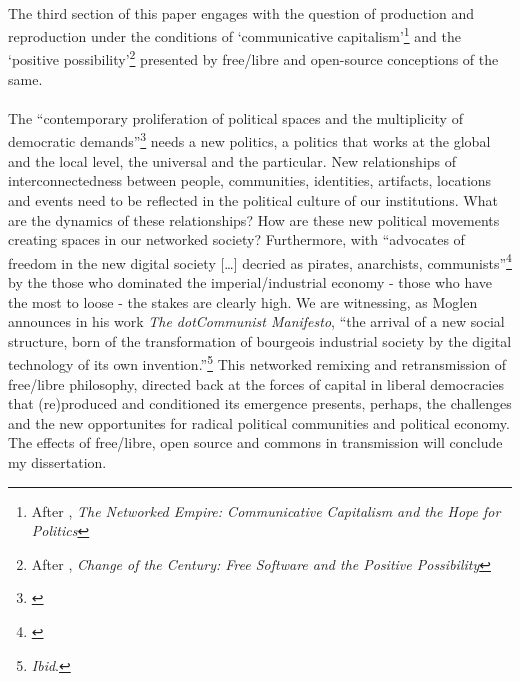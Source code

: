 \paragraph{}The third section of this paper engages with the question of production and reproduction under the conditions of `communicative capitalism'\footnote{After \cite{dean:2005cc}, \textit{The Networked Empire: Communicative Capitalism and the Hope for Politics}} and the `positive possibility'\footnote{After \cite{Hardie:2005px}, \textit{Change of the Century: Free Software and the Positive Possibility}} presented by free/libre and open-source conceptions of the same. 

\paragraph{}The ``contemporary proliferation of political spaces and the multiplicity of democratic demands''\footnote{\cite[p.17]{Mouffe:2000fk}} needs a new politics, a politics that works at the global and the local level, the universal and the particular. New relationships of interconnectedness between people, communities, identities, artifacts, locations and events need to be reflected in the political culture of our institutions. What are the dynamics of these relationships? How are these new political movements creating spaces in our networked society? Furthermore, with ``advocates of freedom in the new digital society [\ldots] decried as pirates, anarchists, communists''\footnote{\cite{moglen:2003dcm}} by the those who dominated the imperial/industrial economy - those who have the most to loose - the stakes are clearly high. We are witnessing, as Moglen announces in his work \textit{The dotCommunist Manifesto}, ``the arrival of a new social structure, born of the transformation of bourgeois industrial society by the digital technology of its own invention.''\footnote{\textit{Ibid}.} This networked remixing and retransmission of free/libre philosophy, directed back at the forces of capital in liberal democracies that (re)produced and conditioned its emergence presents, perhaps, the challenges and the new opportunites for radical political communities and political economy. The effects of free/libre, open source and commons in transmission will conclude my dissertation.
